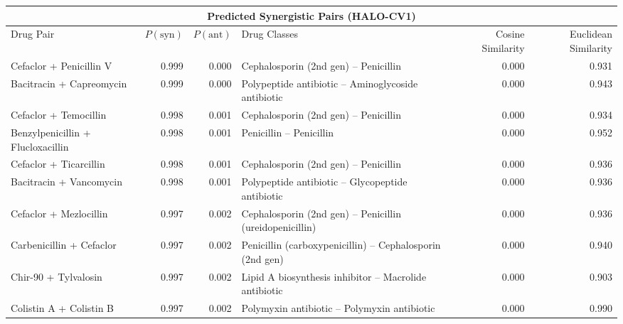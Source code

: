 \documentclass[10pt]{article}
\begin{document}
\begin{table}[t]
    \centering
    \scriptsize
    \setlength{\tabcolsep}{4pt}

    \begin{tabular}{@{} l r r p{5.5cm} r r @{}}
        \toprule
        \multicolumn{6}{c}{\textbf{Predicted Synergistic Pairs (HALO-CV1)}}                                                                          \\
        \midrule
        Drug Pair
                                          & $P(\mathrm{syn})$
                                          & $P(\mathrm{ant})$
                                          & Drug Classes
                                          & Cosine Similarity
                                          & Euclidean Similarity                                                                                     \\
        \midrule
        Cefaclor + Penicillin V           & 0.999                & 0.000 & Cephalosporin (2nd gen) -- Penicillin                     & 0.000 & 0.931 \\
        Bacitracin + Capreomycin          & 0.999                & 0.000 & Polypeptide antibiotic -- Aminoglycoside antibiotic       & 0.000 & 0.943 \\
        Cefaclor + Temocillin             & 0.998                & 0.001 & Cephalosporin (2nd gen) -- Penicillin                     & 0.000 & 0.934 \\
        Benzylpenicillin + Flucloxacillin & 0.998                & 0.001 & Penicillin -- Penicillin                                  & 0.000 & 0.952 \\
        Cefaclor + Ticarcillin            & 0.998                & 0.001 & Cephalosporin (2nd gen) -- Penicillin                     & 0.000 & 0.936 \\
        Bacitracin + Vancomycin           & 0.998                & 0.001 & Polypeptide antibiotic -- Glycopeptide antibiotic         & 0.000 & 0.936 \\
        Cefaclor + Mezlocillin            & 0.997                & 0.002 & Cephalosporin (2nd gen) -- Penicillin (ureidopenicillin)  & 0.000 & 0.936 \\
        Carbenicillin + Cefaclor          & 0.997                & 0.002 & Penicillin (carboxypenicillin) -- Cephalosporin (2nd gen) & 0.000 & 0.940 \\
        Chir-90 + Tylvalosin              & 0.997                & 0.002 & Lipid A biosynthesis inhibitor -- Macrolide antibiotic    & 0.000 & 0.903 \\
        Colistin A + Colistin B           & 0.997                & 0.002 & Polymyxin antibiotic -- Polymyxin antibiotic              & 0.000 & 0.990 \\


\end{tabular}
\end{table}
\end{document}
